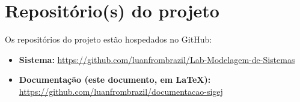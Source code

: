 \chapter{Repositório(s) do projeto}
\label{cap:repositorios}

Os repositórios do projeto estão hospedados no GitHub:

\begin{itemize}
    \item \textbf{Sistema:} \url{https://github.com/luanfrombrazil/Lab-Modelagem-de-Sistemas}
    \item \textbf{Documentação (este documento, em \LaTeX):} \url{https://github.com/luanfrombrazil/documentacao-sigej}
\end{itemize}
